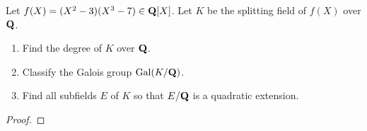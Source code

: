 \begin{problem}
Let $f(X)=(X^2-3)(X^3-7)\in\mathbf{Q}[X]$. Let $K$ be the splitting field of
$f(X)$ over $\mathbf{Q}$.
\begin{enumerate}[label=(\alph*)]
\item Find the degree of $K$ over $\mathbf{Q}$.
\item Classify the Galois group $\operatorname{Gal}(K/\mathbf{Q})$.
\item Find all subfields $E$ of $K$ so that $E/\mathbf{Q}$ is a quadratic
  extension.
\end{enumerate}
\end{problem}
\begin{proof}
\end{proof}

